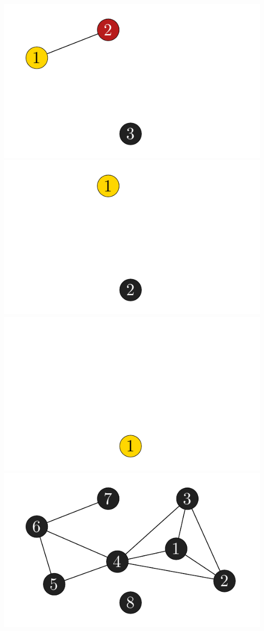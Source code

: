 \documentclass[xcolor=x11names,compress]{beamer}
\begin{document}
\begin{frame}
\begin{center}
\begin{overprint}
			\includegraphics[scale=1.0]{img/graph/peo/12.pdf}
			\onslide<13>\includegraphics[scale=1.0]{img/graph/peo/13.pdf}
			\onslide<14>\includegraphics[scale=1.0]{img/graph/peo/14.pdf}
			\onslide<15>\includegraphics[scale=1.0]{img/graph/peo/01.pdf}

\end{overprint}
\end{center}
\end{frame}
\end{document}
